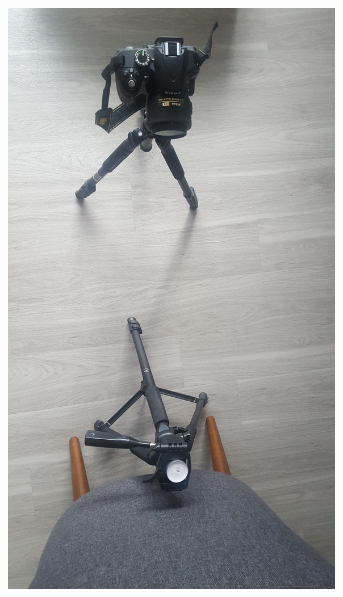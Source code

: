\documentclass[letterpaper,12pt]{article}
\begin{document}
\begin{figure}[h]
    \centering
    \begin{subfigure}[b]{0.3\textwidth}
    	\centering
        \includegraphics[width=0.95\textwidth]{Study_BGDist_Far.JPG}
        \caption{}
        \label{fig:Study_BGDist_Far}
    \end{subfigure}
    \begin{subfigure}[b]{0.3\textwidth}
    	\centering

\end{subfigure}
\end{figure}
\end{document}
